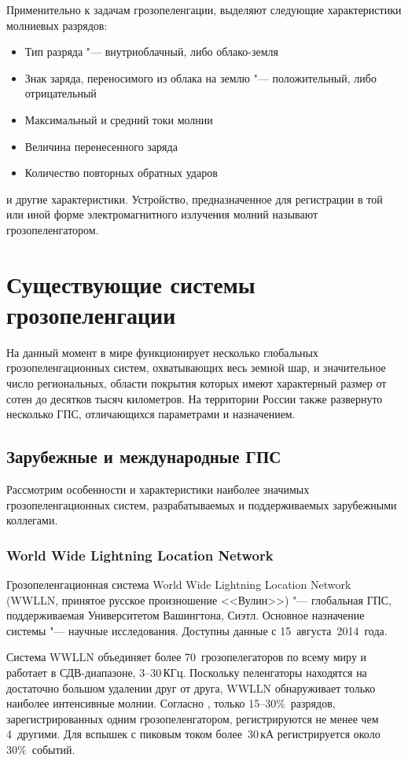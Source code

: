 Применительно к задачам грозопеленгации, выделяют следующие характеристики молниевых разрядов:
\begin{itemize}
	\item Тип разряда "--- внутриоблачный, либо облако-земля
	\item Знак заряда, переносимого из облака на землю "--- положительный, либо отрицательный
	\item Максимальный и средний токи молнии
	\item Величина перенесенного заряда
	\item Количество повторных обратных ударов
\end{itemize}
и другие характеристики. Устройство, предназначенное для регистрации в той или иной форме электромагнитного излучения молний называют грозопеленгатором.

\section{Существующие системы грозопеленгации}
\label{sec:lds-review}
На данный момент в мире функционирует несколько глобальных грозопеленгационных систем, охватывающих весь земной шар, и значительное число региональных, области покрытия которых имеют характерный размер от сотен до десятков тысяч километров. На территории России также развернуто несколько ГПС, отличающихся параметрами и назначением.

\subsection{Зарубежные и международные ГПС}
Рассмотрим особенности и характеристики наиболее значимых грозопеленгационных систем, разрабатываемых и поддерживаемых зарубежными коллегами.

\subsubsection{World Wide Lightning Location Network}
Грозопеленгационная система World Wide Lightning Location Network\cite{wwllnSite} (WWLLN, принятое русское произношение <<Вулин>>) "--- глобальная ГПС, поддерживаемая Университетом Вашингтона, Сиэтл. Основное назначение системы "--- научные исследования. Доступны данные с 15~августа~2014~года.

Система WWLLN объединяет более 70~грозопелегаторов по всему миру и работает в СДВ-диапазоне, 3--30\,КГц. Поскольку пеленгаторы находятся на достаточно большом удалении друг от друга, WWLLN обнаруживает только наиболее интенсивные молнии. Согласно \cite{wwllnSite}, только 15--30\%~разрядов, зарегистрированных одним грозопеленгатором, регистрируются не менее чем 4~другими. Для вспышек с пиковым током более~30\,кА регистрируется около 30\%~событий.

